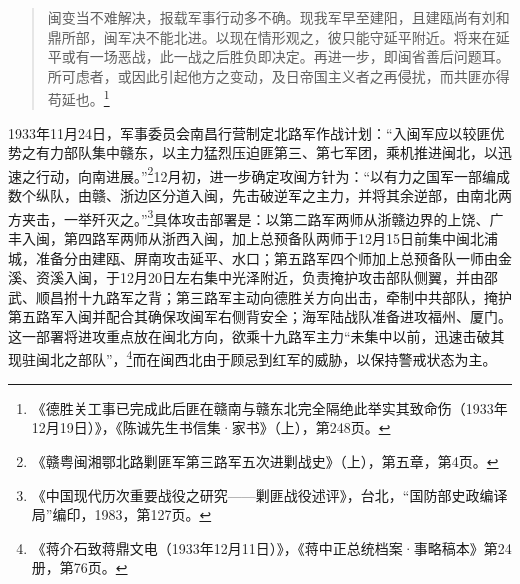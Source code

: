 \begin{quote}

闽变当不难解决，报载军事行动多不确。现我军早至建阳，且建瓯尚有刘和鼎所部，闽军决不能北进。以现在情形观之，彼只能守延平附近。将来在延平或有一场恶战，此一战之后胜负即决定。再进一步，即闽省善后问题耳。所可虑者，或因此引起他方之变动，及日帝国主义者之再侵扰，而共匪亦得苟延也。\footnote{《德胜关工事已完成此后匪在赣南与赣东北完全隔绝此举实其致命伤（1933年12月19日）》，《陈诚先生书信集·家书》（上），第248页。}
\end{quote}


1933年11月24日，军事委员会南昌行营制定北路军作战计划：“入闽军应以较匪优势之有力部队集中赣东，以主力猛烈压迫匪第三、第七军团，乘机推进闽北，以迅速之行动，向南进展。”\footnote{《赣粤闽湘鄂北路剿匪军第三路军五次进剿战史》（上），第五章，第4页。}12月初，进一步确定攻闽方针为：“以有力之国军一部编成数个纵队，由赣、浙边区分道入闽，先击破逆军之主力，并将其余逆部，由南北两方夹击，一举歼灭之。”\footnote{《中国现代历次重要战役之研究——剿匪战役述评》，台北，“国防部史政编译局”编印，1983，第127页。}具体攻击部署是：以第二路军两师从浙赣边界的上饶、广丰入闽，第四路军两师从浙西入闽，加上总预备队两师于12月15日前集中闽北浦城，准备分由建瓯、屏南攻击延平、水口；第五路军四个师加上总预备队一师由金溪、资溪入闽，于12月20日左右集中光泽附近，负责掩护攻击部队侧翼，并由邵武、顺昌拊十九路军之背；第三路军主动向德胜关方向出击，牵制中共部队，掩护第五路军入闽并配合其确保攻闽军右侧背安全；海军陆战队准备进攻福州、厦门。这一部署将进攻重点放在闽北方向，欲乘十九路军主力“未集中以前，迅速击破其现驻闽北之部队”，\footnote{《蒋介石致蒋鼎文电（1933年12月11日）》，《蒋中正总统档案·事略稿本》第24册，第76页。}而在闽西北由于顾忌到红军的威胁，以保持警戒状态为主。


